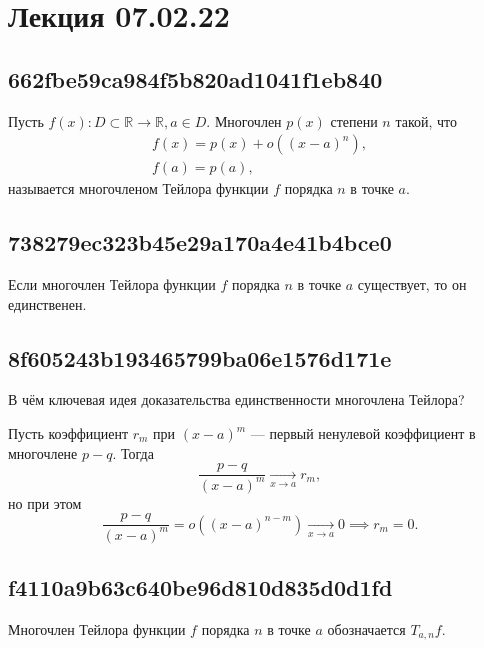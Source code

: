 \documentclass[11pt, a5paper]{article}
\let\oldsection\section
\renewcommand\section{\pagebreak\oldsection}
\newenvironment{note}[1]{\goodbreak\par\subsection{\hfill \color{lightgray}\tiny #1}}{}
\newenvironment{cloze}[2][\ldots]{\begin{leftbar}}{\end{leftbar}}
\newenvironment{icloze}[2][\ldots]{%
  \ignorespaces\text{\tiny \color{lightgray}\{#2} %
}{%
  \text{\tiny\color{lightgray}\}}\unskip%
}
\begin{document}
\section{Лекция 07.02.22}
\begin{note}{662fbe59ca984f5b820ad1041f1eb840}
    Пусть \( f(x) : D \subset \mathbb R  \to \mathbb R, a \in D. \)
    \begin{icloze}{2}Многочлен \( p(x) \) степени \( n \)  такой, что \[
        \begin{gathered}
            f(x) = p(x) + o((x - a)^{n}), \\
            f(a) = p(a),
        \end{gathered}
    \]\end{icloze}
    называется \begin{icloze}{1}многочленом Тейлора функции \( f \) порядка \( n \) в точке \( a. \)\end{icloze}
\end{note}

\begin{note}{738279ec323b45e29a170a4e41b4bce0}
    Если многочлен Тейлора функции \( f \) порядка \( n \) в точке \( a \) существует, то \begin{icloze}{1}он единственен.\end{icloze}
\end{note}

\begin{note}{8f605243b193465799ba06e1576d171e}
    В чём ключевая идея доказательства единственности многочлена Тейлора?

    \begin{cloze}{1}
        Пусть коэффициент \( r_m  \) при \( (x - a)^{m} \) --- первый ненулевой коэффициент в многочлене \( p - q \).
        Тогда \[
            \frac{p - q}{(x - a)^{m} } \underset{x \to a}\longrightarrow r_m,
        \] но при этом \[
            \frac{p - q}{(x - a)^{m} } = o((x - a)^{n - m}) \underset{x \to a}\longrightarrow 0 \implies r_m = 0.
        \]
    \end{cloze}
\end{note}

\begin{note}{f4110a9b63c640be96d810d835d0d1fd}
    \begin{icloze}{2}Многочлен Тейлора функции \( f \) порядка \( n \) в точке \( a \)\end{icloze} обозначается \begin{icloze}{1}\( T_{a, n} f.  \)\end{icloze}
\end{note}
\end{document}
